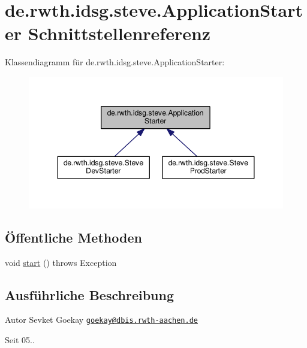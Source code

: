\hypertarget{interfacede_1_1rwth_1_1idsg_1_1steve_1_1_application_starter}{\section{de.\-rwth.\-idsg.\-steve.\-Application\-Starter Schnittstellenreferenz}
\label{interfacede_1_1rwth_1_1idsg_1_1steve_1_1_application_starter}
}


Klassendiagramm für de.\-rwth.\-idsg.\-steve.\-Application\-Starter\-:\nopagebreak
\begin{figure}[H]
\begin{center}
\leavevmode
\includegraphics[width=347pt]{interfacede_1_1rwth_1_1idsg_1_1steve_1_1_application_starter__inherit__graph}
\end{center}
\end{figure}
\subsection*{Öffentliche Methoden}
\begin{DoxyCompactItemize}
\item 
void \hyperlink{interfacede_1_1rwth_1_1idsg_1_1steve_1_1_application_starter_ad6461bffb2faebb821cadba517773b77}{start} ()  throws Exception
\end{DoxyCompactItemize}


\subsection{Ausführliche Beschreibung}
\begin{DoxyAuthor}{Autor}
Sevket Goekay \href{mailto:goekay@dbis.rwth-aachen.de}{\tt goekay@dbis.\-rwth-\/aachen.\-de} 
\end{DoxyAuthor}
\begin{DoxySince}{Seit}
05.. 
\end{DoxySince}



